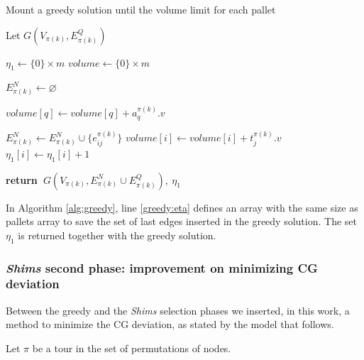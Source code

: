 \documentclass[preprint,authoryear]{elsarticle}
\renewcommand{\Return}{\State \bf {return}~}
\begin{document}
\begin{algorithm}[H]
	\caption{Mount a greedy solution until the volume limit for each pallet}  \label{alg:greedy}
	
	\begin{algorithmic}[1]
		
		
		\State Let $G(V_{\pi(k)}, E^Q_{\pi(k)})$
		
		\State $\eta_1 \gets \{0\} \times m$ \label{greedy:eta}
		\State $volume \gets \{0\} \times m$
		
		\State $E^N_{\pi(k)} \gets \varnothing$ 			
		
		\State $volume[q] \gets volume[q] + a_q^{\pi(k)}.v$ 
		\EndIf		
		\EndFor
		
		\State $E^N_{\pi(k)} \gets E^N_{\pi(k)} \cup \{e_{ij}^{\pi(k)}\}$ 
		\State $volume[i] \gets volume[i] + t_j^{\pi(k)}.v$
		\State $\eta_1[i] \gets \eta_1[i] + 1$ 	
		\EndIf
		\EndFor
		
		\Return $G(V_{\pi(k)}, E^N_{\pi(k)} \cup E^Q_{\pi(k)}),\ \eta_1$ 
		
		\EndProcedure
		
	\end{algorithmic}
\end{algorithm}

In Algorithm \ref{alg:greedy}, line \ref{greedy:eta} defines an array with the same size as pallets array to save the set of last edges inserted in the greedy solution. The set $\eta_1$ is returned together with the greedy solution.



\subsubsection{{\it Shims} second phase: improvement on minimizing CG deviation}

Between the greedy and the {\it Shims} selection phases we inserted, in this work, a method to minimize the CG deviation, as stated by the model that follows.

Let $\pi$ be a tour in the set of permutations of nodes.
\end{document}
